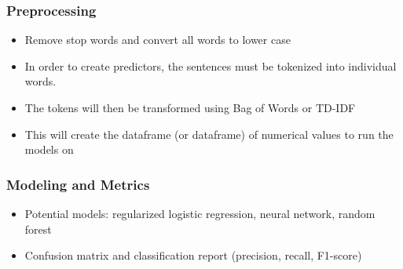 \documentclass{beamer}
\begin{document}
\begin{frame}
  \frametitle{Preprocessing}
  \footnotesize
  \begin{itemize}
  \item Remove stop words and convert all words to lower case
  \item In order to create predictors, the sentences must be tokenized into individual words.
  \item The tokens will then be transformed using Bag of Words or TD-IDF
  \item This will create the dataframe (or dataframe) of numerical values to run the models on
  \end{itemize}
\end{frame}

\begin{frame}
  \frametitle{Modeling and Metrics}
  \begin{itemize}
  \item Potential models: regularized logistic regression, neural network, random forest
  \item Confusion matrix and classification report (precision, recall, F1-score)
  \end{itemize}
\end{frame}
\end{document}
